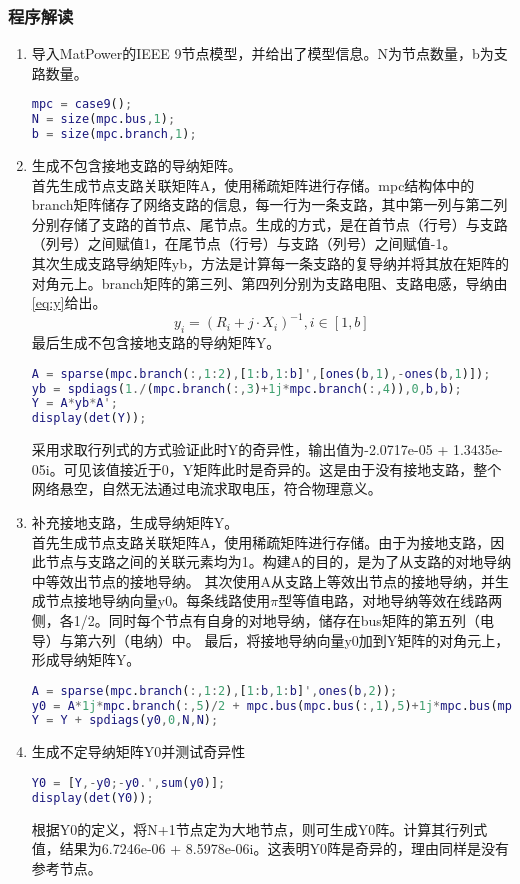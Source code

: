 \documentclass[a4paper,12pt]{article}
\begin{document}
    \subsubsection{程序解读}
    \begin{enumerate}
      \item 导入MatPower的IEEE 9节点模型，并给出了模型信息。N为节点数量，b为支路数量。
      \begin{lstlisting}[language=matlab]
mpc = case9();
N = size(mpc.bus,1);
b = size(mpc.branch,1);
      \end{lstlisting}
      \item 生成不包含接地支路的导纳矩阵。\\
      首先生成节点支路关联矩阵A，使用稀疏矩阵进行存储。mpc结构体中的branch矩阵储存了网络支路的信息，每一行为一条支路，其中第一列与第二列分别存储了支路的首节点、尾节点。生成的方式，是在首节点（行号）与支路（列号）之间赋值1，在尾节点（行号）与支路（列号）之间赋值-1。\\
      其次生成支路导纳矩阵yb，方法是计算每一条支路的复导纳并将其放在矩阵的对角元上。branch矩阵的第三列、第四列分别为支路电阻、支路电感，导纳由\cref{eq:y}给出。\\
      \begin{equation}
        \label{eq:y}
        y_i = (R_i + j \cdot X_i)^{-1}, i\in[1, b]
      \end{equation}
      最后生成不包含接地支路的导纳矩阵Y。\\
      \begin{lstlisting}[language=matlab]
A = sparse(mpc.branch(:,1:2),[1:b,1:b]',[ones(b,1),-ones(b,1)]);
yb = spdiags(1./(mpc.branch(:,3)+1j*mpc.branch(:,4)),0,b,b);
Y = A*yb*A';
display(det(Y));
      \end{lstlisting}
      采用求取行列式的方式验证此时Y的奇异性，输出值为-2.0717e-05 + 1.3435e-05i。可见该值接近于0，Y矩阵此时是奇异的。这是由于没有接地支路，整个网络悬空，自然无法通过电流求取电压，符合物理意义。
      \item 补充接地支路，生成导纳矩阵Y。\\
      首先生成节点支路关联矩阵A，使用稀疏矩阵进行存储。由于为接地支路，因此节点与支路之间的关联元素均为1。构建A的目的，是为了从支路的对地导纳中等效出节点的接地导纳。
      其次使用A从支路上等效出节点的接地导纳，并生成节点接地导纳向量y0。每条线路使用$\pi$型等值电路，对地导纳等效在线路两侧，各1/2。同时每个节点有自身的对地导纳，储存在bus矩阵的第五列（电导）与第六列（电纳）中。
      最后，将接地导纳向量y0加到Y矩阵的对角元上，形成导纳矩阵Y。
      \begin{lstlisting}[language=matlab]
A = sparse(mpc.branch(:,1:2),[1:b,1:b]',ones(b,2));
y0 = A*1j*mpc.branch(:,5)/2 + mpc.bus(mpc.bus(:,1),5)+1j*mpc.bus(mpc.bus(:,1),6);
Y = Y + spdiags(y0,0,N,N);
      \end{lstlisting}
      \item 生成不定导纳矩阵Y0并测试奇异性
      \begin{lstlisting}[language=matlab]
Y0 = [Y,-y0;-y0.',sum(y0)];
display(det(Y0));
      \end{lstlisting}
      根据Y0的定义，将N+1节点定为大地节点，则可生成Y0阵。计算其行列式值，结果为6.7246e-06 + 8.5978e-06i。这表明Y0阵是奇异的，理由同样是没有参考节点。
    \end{enumerate}
\end{document}
